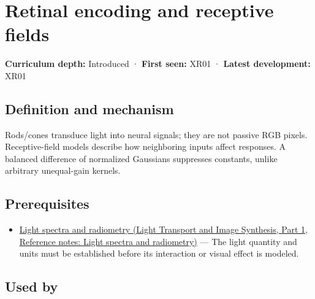 \hypertarget{appendix-7281c15ac44a}{}\label{referencestart:appendix-7281c15ac44a}
\section{Retinal encoding and receptive fields}\label{appendix-7281c15ac44a-retinal-encoding-and-receptive-fields}

\hypertarget{appendix-7281c15ac44a-retinal-encoding-and-receptive-fields}{}

\textbf{Curriculum depth:} Introduced · \textbf{First seen:} XR01 · \textbf{Latest development:} XR01

\begin{allmightroledefinition}

\subsection{Definition and mechanism}\label{appendix-7281c15ac44a-definition-and-mechanism}

\hypertarget{appendix-7281c15ac44a-definition-and-mechanism}{}

Rods/cones transduce light into neural signals; they are not passive RGB pixels. Receptive-field models describe how neighboring inputs affect responses. A balanced difference of normalized Gaussians suppresses constants, unlike arbitrary unequal-gain kernels.

\end{allmightroledefinition}

\subsection{Prerequisites}\label{appendix-7281c15ac44a-prerequisites}

\hypertarget{appendix-7281c15ac44a-prerequisites}{}

\begin{itemize}
\tightlist
\item
  \href{../04-Light-Transport-and-Image-Synthesis-P01/main.pdf\#appendix-215c2570199b}{Light spectra and radiometry (Light Transport and Image Synthesis, Part 1, Reference notes: Light spectra and radiometry)} --- The light quantity and units must be established before its interaction or visual effect is modeled.
\end{itemize}

\subsection{Used by}\label{appendix-7281c15ac44a-used-by}

